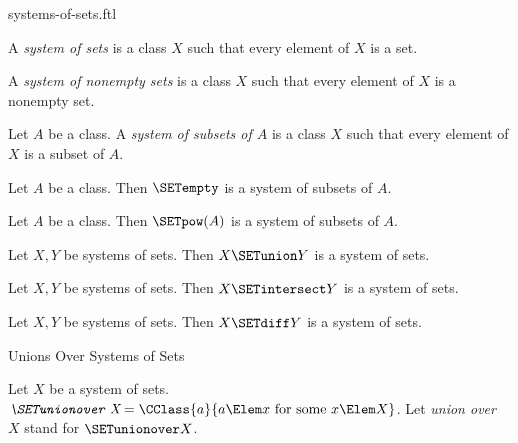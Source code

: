 \documentclass{stex}
\begin{document}
\begin{smodule}{systems-of-sets.ftl}

\begin{definition}[forthel]
  A \emph{system of sets} is a class $X$ such that every element of $X$ is a set.
\end{definition}

\begin{definition}[forthel]
  A \emph{system of nonempty sets} is a class $X$ such that every element of $X$ is a nonempty set.
\end{definition}

\begin{definition}[forthel]
  Let $A$ be a class.
  A \emph{system of subsets of $A$} is a class $X$ such that every element of $X$ is a subset of $A$.
\end{definition}

\begin{proposition}[forthel]
  Let $A$ be a class.
  Then $\SETempty$ is a system of subsets of $A$.
\end{proposition}

\begin{proposition}[forthel]
  Let $A$ be a class.
  Then $\SETpow(A)$ is a system of subsets of $A$.
\end{proposition}

\begin{proposition}[forthel]
  Let $X, Y$ be systems of sets.
  Then $X \SETunion Y$ is a system of sets.
\end{proposition}

\begin{proposition}[forthel]
  Let $X, Y$ be systems of sets.
  Then $X \SETintersect Y$ is a system of sets.
\end{proposition}

\begin{proposition}[forthel]
  Let $X, Y$ be systems of sets.
  Then $X \SETdiff Y$ is a system of sets.
\end{proposition}

\begin{sfragment}{Unions Over Systems of Sets}
  \begin{definition}[forthel]
    Let $X$ be a system of sets.
    $\emph{\SETunionover X} = \CClass{a}{a \Elem x\text{ for some }x \Elem X}$.
    Let \emph{union over $X$} stand for $\SETunionover X$.
  \end{definition}


\end{sfragment}
\end{smodule}
\end{document}
